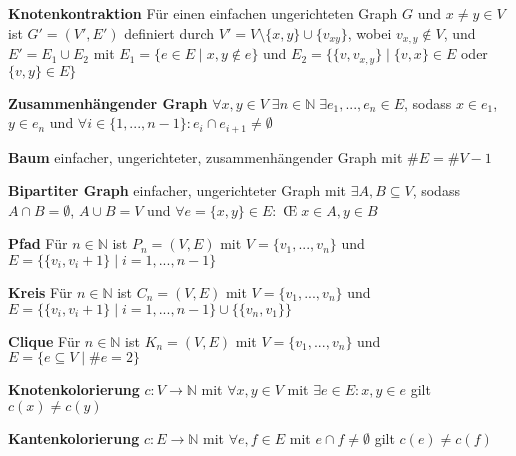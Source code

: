 \documentclass{article}
\begin{document}
	\hangindent=1.5cm 
	\textbf{Knotenkontraktion} \newline
	Für einen einfachen ungerichteten Graph $G$ und $x \neq y \in V$ ist $G'=(V',E')$ definiert durch $V' = V \setminus \{x,y\} \cup \{v_{xy}\}$, wobei $v_{x,y} \notin V$, und $E' = E_1 \cup E_2$ mit $E_1 = \{e \in E \mid x,y \notin e\}$ und $E_2 = \{\{v, v_{x,y}\} \mid \{v,x\} \in E $ oder $ \{v,y\} \in E\}$
	
	
	\hangindent=1.5cm 
	\textbf{Zusammenhängender Graph} \newline
	$\forall x,y \in V \;\exists n \in \mathbb N \;\exists e_1, ..., e_n \in E$, sodass $x \in e_1$, $y \in e_n$ und $\forall i \in \{1, ..., n-1\}: e_i \cap e_{i+1} \neq \emptyset$
	
	\hangindent=1.5cm 
	\textbf{Baum} \newline
	einfacher, ungerichteter, zusammenhängender Graph mit $\# E = \#V-1$
	
	\hangindent=1.5cm 
	\textbf{Bipartiter Graph} \newline
	einfacher, ungerichteter Graph mit $\exists A,B \subseteq V$, sodass $A \cap B = \emptyset$, $A \cup B = V$ und $\forall e = \{x,y\} \in E:$ \OE $\; x \in A, y \in B$
	
	\hangindent=1.5cm 
	\textbf{Pfad} \newline
	Für $n \in \mathbb N$ ist $P_n = (V,E)$ mit $V = \{v_1, ..., v_n\}$ und $E = \{\{v_i, v_i+1\} \mid i = 1, ..., n-1\}$
	
	\hangindent=1.5cm 
	\textbf{Kreis} \newline
	Für $n \in \mathbb N$ ist $C_n = (V,E)$ mit $V = \{v_1, ..., v_n\}$ und $E = \{\{v_i, v_i+1\} \mid i = 1, ..., n-1\} \cup \{\{v_n, v_1\}\}$
	
	\hangindent=1.5cm 
	\textbf{Clique} \newline
	Für $n \in \mathbb N$ ist $K_n = (V,E)$ mit $V = \{v_1, ..., v_n\}$ und $E = \{e \subseteq V \mid \#e = 2\}$
	
	
	\hangindent=1.5cm 
	\textbf{Knotenkolorierung} \newline
	$c: V \to \mathbb N$ mit $\forall x,y \in V$ mit $\exists e \in E: x,y \in e$ gilt $c(x) \neq c(y)$
	
	\hangindent=1.5cm 
	\textbf{Kantenkolorierung} \newline
	$c: E \to \mathbb N$ mit $\forall e,f \in E$ mit $e \cap f \neq \emptyset$ gilt $c(e) \neq c(f)$
	
\end{document}
